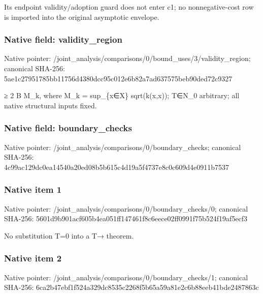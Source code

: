 \documentclass[10pt,a4paper]{article}
\begin{document}
\begingroup\raggedright\sloppy Its endpoint validity/\allowbreak{}adoption guard does not enter c1;\allowbreak{} no nonnegative-cost row is imported into the original asymptotic envelope.\par\endgroup

\subsubsection{Native field: validity\_\allowbreak{}region}
Native pointer: /joint\_\allowbreak{}analysis/comparisons/0/bound\_\allowbreak{}uses/3/validity\_\allowbreak{}region; canonical SHA-256: 5ae1c27951785bb11756d4380dcc95c012e6b82a7ad637575beb90ded72c9327

\begingroup\raggedright{}\allowbreak{} {\AtlasUnicodeSymbols ≥}\allowbreak{} 2 B M\_\allowbreak{}k,\allowbreak{} where M\_\allowbreak{}k =\allowbreak{} sup\_\allowbreak{}\{x{\AtlasUnicodeSymbols ∈}\allowbreak{}X\} sqrt(k(x,\allowbreak{}x));\allowbreak{} T{\AtlasUnicodeSymbols ∈}\allowbreak{}N\_\allowbreak{}0 arbitrary;\allowbreak{} all native structural inputs fixed.\par\endgroup

\subsubsection{Native field: boundary\_\allowbreak{}checks}
Native pointer: /joint\_\allowbreak{}analysis/comparisons/0/boundary\_\allowbreak{}checks; canonical SHA-256: 4c99ac129dc0ea14540a20ed08b5b615c4d19a5f4737e8c0c609d4e0911b7537

\subsubsection{Native item 1}
Native pointer: /joint\_\allowbreak{}analysis/comparisons/0/boundary\_\allowbreak{}checks/0; canonical SHA-256: 5601d9b901acf605b4ea051ff147461f8c6eece02ff0991f75b524f19af5ecf3

\begingroup\raggedright\sloppy No substitution T=\allowbreak{}0 into a T{\AtlasUnicodeSymbols →}\allowbreak{} theorem.\par\endgroup

\subsubsection{Native item 2}
Native pointer: /joint\_\allowbreak{}analysis/comparisons/0/boundary\_\allowbreak{}checks/1; canonical SHA-256: 6ca2b47ebf1f524a329dc8535c2268f5b65a59a81e2c6b88eeb41bde2487863c
\end{document}
